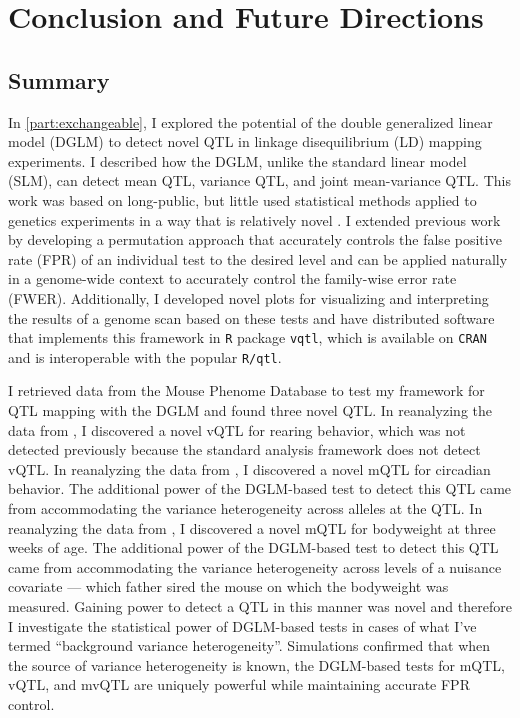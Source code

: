 \chapter{Conclusion and Future Directions}

\section{Summary}

In \autoref{part:exchangeable}, I explored the potential of the double generalized linear model (DGLM) to detect novel QTL in linkage disequilibrium (LD) mapping experiments.
I described how the DGLM, unlike the standard linear model (SLM), can detect mean QTL, variance QTL, and joint mean-variance QTL.
This work was based on long-public, but little used statistical methods \citep{Smyth1989} applied to genetics experiments in a way that is relatively novel \citep{Pare2010,Ronnegard2011a}.
I extended previous work by developing a permutation approach that accurately controls the false positive rate (FPR) of an individual test to the desired level and can be applied naturally in a genome-wide context to accurately control the family-wise error rate (FWER).
Additionally, I developed novel plots for visualizing and interpreting the results of a genome scan based on these tests and have distributed software that implements this framework in \texttt{R} package \texttt{vqtl}, which is available on \texttt{CRAN} and is interoperable with the popular \texttt{R/qtl}.

I retrieved data from the Mouse Phenome Database to test my framework for QTL mapping with the DGLM and found three novel QTL.
In reanalyzing the data from \citet{Bailey2008}, I discovered a novel vQTL for rearing behavior, which was not detected previously because the standard analysis framework does not detect vQTL.
In reanalyzing the data from \citet{Kumar2013}, I discovered a novel mQTL for circadian behavior.
The additional power of the DGLM-based test to detect this QTL came from accommodating the variance heterogeneity across alleles at the QTL.
In reanalyzing the data from \citet{Leamy2000}, I discovered a novel mQTL for bodyweight at three weeks of age.
The additional power of the DGLM-based test to detect this QTL came from accommodating the variance heterogeneity across levels of a nuisance covariate --- which father sired the mouse on which the bodyweight was measured.
Gaining power to detect a QTL in this manner was novel and therefore I investigate the statistical power of DGLM-based tests in cases of what I've termed ``background variance heterogeneity''.
Simulations confirmed that when the source of variance heterogeneity is known, the DGLM-based tests for mQTL, vQTL, and mvQTL are uniquely powerful while maintaining accurate FPR control.


